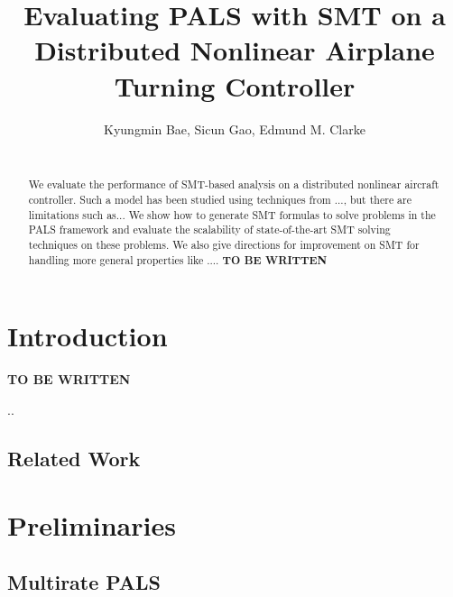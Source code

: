 \documentclass{sig-alternate}
\begin{document}
\title{Evaluating PALS with SMT on a Distributed Nonlinear Airplane Turning Controller
}

\author{
Kyungmin Bae, Sicun Gao, Edmund M. Clarke\\
\\
}

\maketitle
\begin{abstract}
We evaluate the performance of SMT-based analysis on a distributed
nonlinear aircraft controller. Such a model has been studied using
techniques from ..., but there are limitations such as... We show how
to generate SMT formulas to solve problems in the PALS framework and
evaluate the scalability of state-of-the-art SMT solving techniques on
these problems. We also give directions for improvement on SMT for
handling more general properties like ....
\textbf{TO BE WRITTEN}
\end{abstract}

\section{Introduction}

\textbf{TO BE WRITTEN}

\newpage
..

\newpage

\subsection{Related Work}

\newpage



\section{Preliminaries}

\subsection{Multirate PALS} 
\end{document}
